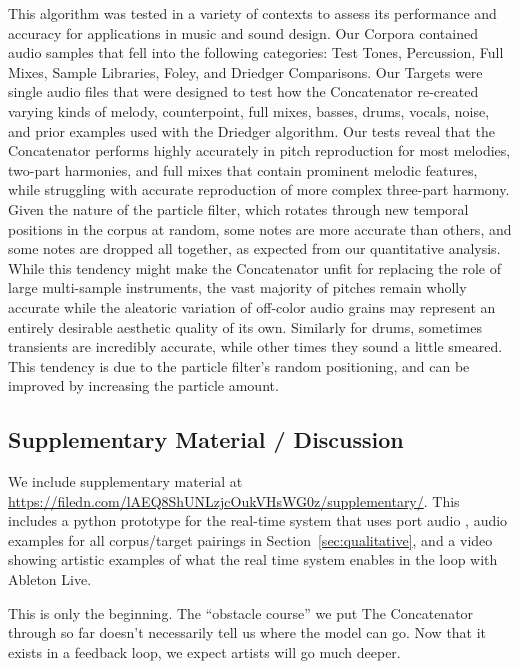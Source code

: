 \documentclass{article}
\begin{document}
This algorithm was tested in a variety of contexts to assess its performance and accuracy for applications in music and sound design. Our Corpora contained audio samples that fell into the following categories: Test Tones, Percussion, Full Mixes, Sample Libraries, Foley, and Driedger Comparisons. Our Targets were single audio files that were designed to test how the Concatenator re-created varying kinds of melody, counterpoint, full mixes, basses, drums, vocals, noise, and prior examples used with the Driedger algorithm. 
Our tests reveal that the Concatenator performs highly accurately in pitch reproduction for most melodies, two-part harmonies, and full mixes that contain prominent melodic features, while struggling with accurate reproduction of more complex three-part harmony. 
Given the nature of the particle filter, which rotates through new temporal positions in the corpus at random, some notes are more accurate than others, and some notes are dropped all together, as expected from our quantitative analysis. While this tendency might make the Concatenator unfit for replacing the role of large multi-sample instruments, the vast majority of pitches remain wholly accurate while the aleatoric variation of off-color audio grains may represent an entirely desirable aesthetic quality of its own.
Similarly for drums, sometimes transients are incredibly accurate, while other times they sound a little smeared. This tendency is due to the particle filter's random positioning, and can be improved by increasing the particle amount.


\subsection{Supplementary Material / Discussion}

We include supplementary material at \url{https://filedn.com/lAEQ8ShUNLzjcOukVHsWG0z/supplementary/}.  This includes a python prototype for the real-time system that uses port audio \cite{bencina2001portaudio}, audio examples for all corpus/target pairings in Section~\ref{sec:qualitative}, and a video showing artistic examples of what the real time system enables in the loop with Ableton Live.

This is only the beginning.  The ``obstacle course'' we put The Concatenator through so far doesn't necessarily tell us where the model can go. Now that it exists in a feedback loop, we expect artists will go much deeper.


\end{document}
